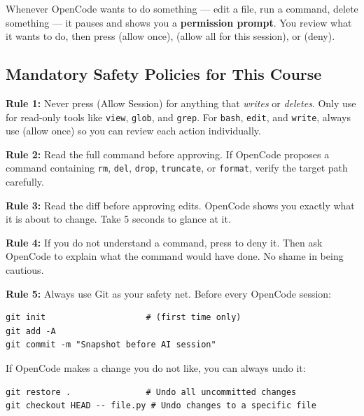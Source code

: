 \documentclass[12pt]{article}
\newcommand{\key}[1]{\keystroke{#1}}
\newcommand{\keystroke}[1]{%
  \tikz[baseline=(key.base)]{%
    \node[draw, rounded corners=2pt, inner sep=2pt, fill=gray!10,
          font=\ttfamily\small] (key) {#1};%
  }%
}
\begin{document}
Whenever OpenCode wants to do something --- edit a file, run a command, delete something --- it pauses and shows you a \textbf{permission prompt}.  You review what it wants to do, then press \key{a} (allow once), \key{A} (allow all for this session), or \key{d} (deny).

\subsection{Mandatory Safety Policies for This Course}

\begin{alert-box}
\textbf{Rule 1:} Never press \key{A} (Allow Session) for anything that \emph{writes} or \emph{deletes}.  Only use \key{A} for read-only tools like \texttt{view}, \texttt{glob}, and \texttt{grep}.  For \texttt{bash}, \texttt{edit}, and \texttt{write}, always use \key{a} (allow once) so you can review each action individually.
\end{alert-box}

\begin{alert-box}
\textbf{Rule 2:} Read the full command before approving.  If OpenCode proposes a command containing \texttt{rm}, \texttt{del}, \texttt{drop}, \texttt{truncate}, or \texttt{format}, verify the target path carefully.
\end{alert-box}

\begin{alert-box}
\textbf{Rule 3:} Read the diff before approving edits.  OpenCode shows you exactly what it is about to change.  Take 5 seconds to glance at it.
\end{alert-box}

\begin{alert-box}
\textbf{Rule 4:} If you do not understand a command, press \key{d} to deny it.  Then ask OpenCode to explain what the command would have done.  No shame in being cautious.
\end{alert-box}

\begin{alert-box}
\textbf{Rule 5:} Always use Git as your safety net.  Before every OpenCode session:
\begin{lstlisting}[style=term]
git init                    # (first time only)
git add -A
git commit -m "Snapshot before AI session"
\end{lstlisting}
If OpenCode makes a change you do not like, you can always undo it:
\begin{lstlisting}[style=term]
git restore .               # Undo all uncommitted changes
git checkout HEAD -- file.py # Undo changes to a specific file
\end{lstlisting}
\end{alert-box}
\end{document}

